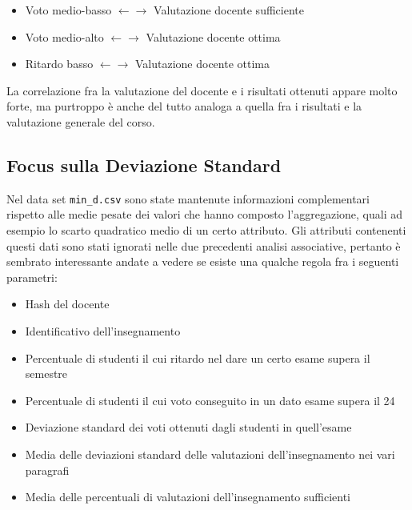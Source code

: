             \begin{itemize}
                \item Voto medio-basso $\leftarrow \rightarrow$ Valutazione docente sufficiente
                \item Voto medio-alto $\leftarrow \rightarrow$ Valutazione docente ottima
                \item Ritardo basso $\leftarrow \rightarrow$ Valutazione docente ottima
            \end{itemize}

            La correlazione fra la valutazione del docente e i risultati ottenuti appare molto forte, ma purtroppo è anche del tutto analoga a quella fra i risultati e la valutazione generale del corso.

        \subsection{Focus sulla Deviazione Standard}

        Nel data set \texttt{min\_d.csv} sono state mantenute informazioni complementari rispetto alle medie pesate dei valori che hanno composto l'aggregazione, quali ad esempio lo scarto quadratico medio di un certo attributo. Gli attributi contenenti questi dati sono stati ignorati nelle due precedenti analisi associative, pertanto è sembrato interessante andate a vedere se esiste una qualche regola fra i seguenti parametri:

            \begin{itemize}
                \item Hash del docente
                \item Identificativo dell'insegnamento
                \item Percentuale di studenti il cui ritardo nel dare un certo esame supera il semestre
                \item Percentuale di studenti il cui voto conseguito in un dato esame supera il 24
                \item Deviazione standard dei voti ottenuti dagli studenti in quell'esame
                \item Media delle deviazioni standard delle valutazioni dell'insegnamento nei vari paragrafi
                \item Media delle percentuali di valutazioni dell'insegnamento sufficienti  
            \end{itemize}

            

